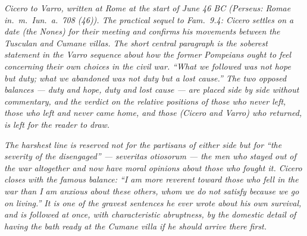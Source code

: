 
\textit{Cicero to Varro, written at Rome at the start of June 46
BC (Perseus: \textit{Romae in.~m.~Iun.~a.~708 (46)}). The
practical sequel to \textit{Fam.}~9.4: Cicero settles on a date
(the Nones) for their meeting and confirms his movements between
the Tusculan and Cumane villas. The short central paragraph is
the soberest statement in the Varro sequence about how the
former Pompeians ought to feel concerning their own choices in
the civil war. ``What we followed was not hope but duty; what we
abandoned was not duty but a lost cause.'' The two opposed
balances --- duty and hope, duty and lost cause --- are placed
side by side without commentary, and the verdict on the relative
positions of those who never left, those who left and never came
home, and those (Cicero and Varro) who returned, is left for the
reader to draw.}

\textit{The harshest line is reserved not for the partisans of
either side but for ``the severity of the disengaged'' ---
\textit{severitas otiosorum} --- the men who stayed out of the
war altogether and now have moral opinions about those who
fought it. Cicero closes with the famous balance: ``I am more
reverent toward those who fell in the war than I am anxious
about these others, whom we do not satisfy because we go on
living.'' It is one of the gravest sentences he ever wrote about
his own survival, and is followed at once, with characteristic
abruptness, by the domestic detail of having the bath ready at
the Cumane villa if he should arrive there first.}
